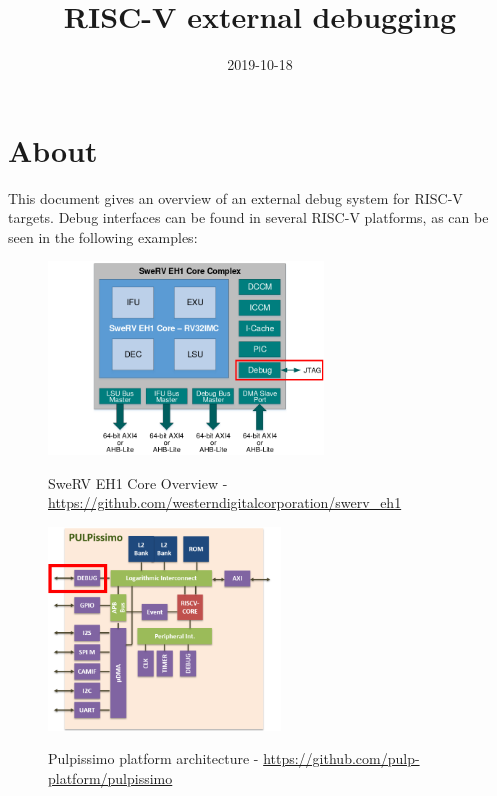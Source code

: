 \documentclass{article}
\title{RISC-V external debugging}
\date{2019-10-18}
\begin{document}
	\maketitle
	
	\section{About}
	
	This document gives an overview of an external debug system for RISC-V targets. Debug interfaces can be found in several RISC-V platforms, as can be seen in the following examples:
	
	\begin{figure}[H]
   	\centering
   	\includegraphics[width=0.65\textwidth]{swerv.png}
   	
   	SweRV EH1 Core Overview - \url{https://github.com/westerndigitalcorporation/swerv_eh1}
	\end{figure}
	
	\begin{figure}[H]
   	\centering
   	\includegraphics[width=0.55\textwidth]{pulpissimo.png}
   	
   	Pulpissimo platform architecture - \url{https://github.com/pulp-platform/pulpissimo}
	\end{figure}
	
\end{document}
